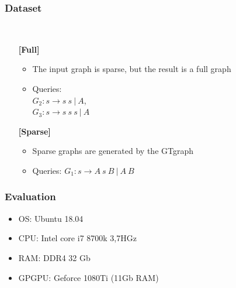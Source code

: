 \documentclass[xcolor=table]{beamer}
\begin{document}
\begin{frame}[fragile] \frametitle{Dataset}
  \begin{minipage}[t]{1cm}
\hspace{1cm}
  \end{minipage}
  ~
\begin{minipage}[t]{0.85\textwidth}
\begin{itemize}
\item[\textbf{[Full]}]
\begin{itemize}
  \item The input graph is sparse, but the result is a full graph
  \item Queries: \\ $G_2: s \to s \ s \ | \ A$, \\ $G_3: s \to s \ s \ s \ | \ A$
\end{itemize}
\pause
\item[\textbf{[Sparse]}]
\begin{itemize}
  \item Sparse graphs are generated by the GTgraph
  \item Queries: $G_1: s \to A \ s \ B \ | \ A \ B$
\end{itemize}
\end{itemize}
\end{minipage}
\end{frame}

\begin{frame} \frametitle{Evaluation}
  \begin{itemize}
   \item OS: Ubuntu 18.04
   \item CPU: Intel core i7 8700k 3,7HGz
   \item RAM: DDR4 32 Gb
   \item GPGPU: Geforce 1080Ti (11Gb RAM)
  \end{itemize}
\end{frame}
\end{document}
